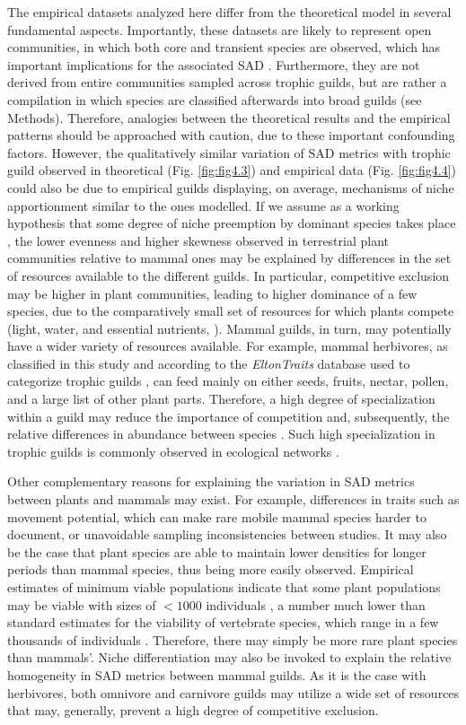 The empirical datasets analyzed here differ from the theoretical model in several fundamental aspects. Importantly, these datasets are likely to represent open communities, in which both core and transient species are observed, which has important implications for the associated SAD \citep{Magurran2003}. Furthermore, they are not derived from entire communities sampled across trophic guilds, but are rather a compilation in which species are classified afterwards into broad guilds (see Methods). Therefore, analogies between the theoretical results and the empirical patterns should be approached with caution, due to these important confounding factors. However, the qualitatively similar variation of SAD metrics with trophic guild observed in theoretical (Fig. \ref{fig:fig4.3}) and empirical data (Fig. \ref{fig:fig4.4}) could also be due to empirical guilds displaying, on average, mechanisms of niche apportionment similar to the ones modelled. If we assume as a working hypothesis that some degree of niche preemption by dominant species takes place \citep{Sugihara2003}, the lower evenness and higher skewness observed in terrestrial plant communities relative to mammal ones may be explained by differences in the set of resources available to the different guilds. In particular, competitive exclusion may be higher in plant communities, leading to higher dominance of a few species, due to the comparatively small set of resources for which plants compete (light, water, and essential nutrients, \citealt{Austin1990}). Mammal guilds, in turn, may potentially have a wider variety of resources available. For example, mammal herbivores, as classified in this study and according to the \textit{EltonTraits} database used to categorize trophic guilds \citep{Wilman2014}, can feed mainly on either seeds, fruits, nectar, pollen, and a large list of other plant parts. Therefore, a high degree of specialization within a guild may reduce the importance of competition and, subsequently, the relative differences in abundance between species \citep{Sugihara2003}. Such high specialization in trophic guilds is commonly observed in ecological networks \citep{Dunne2002, Gravel2011}.

Other complementary reasons for explaining the variation in SAD metrics between plants and mammals may exist. For example, differences in traits such as movement potential, which can make rare mobile mammal species harder to document, or unavoidable sampling inconsistencies between studies. It may also be the case that plant species are able to maintain lower densities for longer periods than mammal species, thus being more easily observed. Empirical estimates of minimum viable populations indicate that some plant populations may be viable with sizes of $< 1000$ individuals \citep{Nantel1996}, a number much lower than standard estimates for the viability of vertebrate species, which range in a few thousands of individuals \citep{Reed2003}. Therefore, there may simply be more rare plant species than mammals'. Niche differentiation may also be invoked to explain the relative homogeneity in SAD metrics between mammal guilds. As it is the case with herbivores, both omnivore and carnivore guilds may utilize a wide set of resources that may, generally, prevent a high degree of competitive exclusion.

